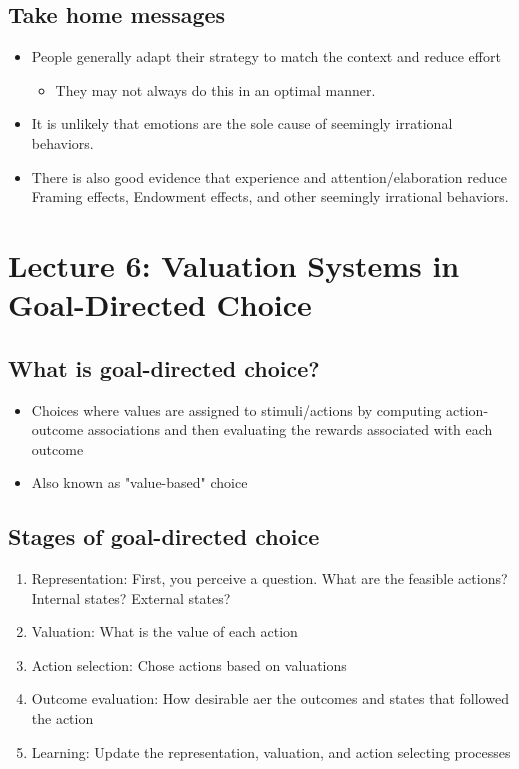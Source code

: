 \subsection{Take home messages}
\begin{itemize}
    \item People generally adapt their strategy to match the context and reduce effort
\begin{itemize}
    \item They may not always do this in an optimal manner. 
\end{itemize}
\item It is unlikely that emotions are the sole cause of seemingly irrational behaviors.
\item There is also good evidence that experience and attention/elaboration reduce Framing effects, Endowment effects, and other seemingly irrational behaviors.
\end{itemize}

\section{Lecture 6: Valuation Systems in Goal-Directed Choice}
\subsection{What is goal-directed choice?}
\begin{itemize}
    \item Choices where values are assigned to stimuli/actions by computing action-outcome associations and then evaluating the rewards associated with each outcome
    \item Also known as "value-based" choice
\end{itemize}
\subsection{Stages of goal-directed choice}
\begin{enumerate}
    \item Representation: First, you perceive a question. What are the feasible actions? Internal states? External states?
    \item Valuation: What is the value of each action
    \item Action selection: Chose actions based on valuations
    \item Outcome evaluation: How desirable aer the outcomes and states that followed the action
    \item Learning: Update the representation, valuation, and action selecting processes
\end{enumerate}
